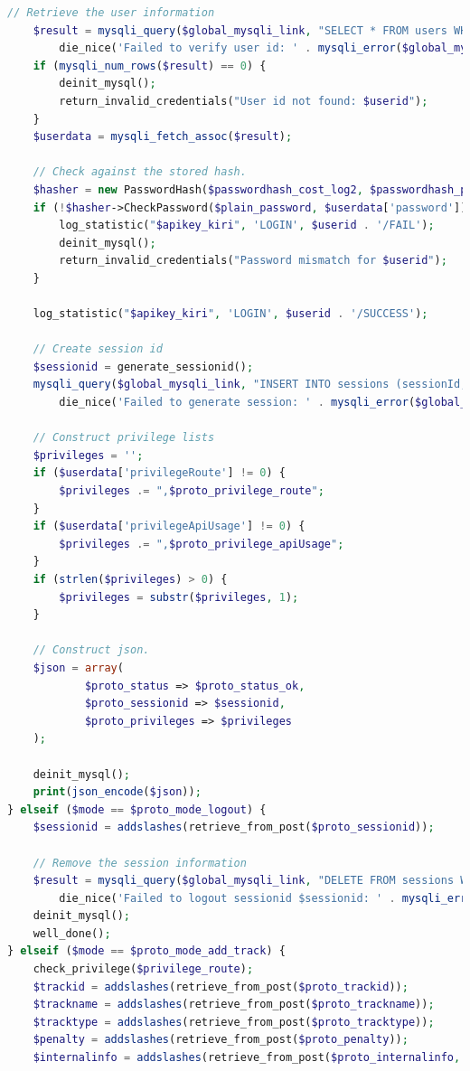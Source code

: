 \documentclass[a4paper,twoside]{article}
\begin{document}
\begin{enumerate}
\begin{lstlisting}[language=PHP,basicstyle=\tiny,caption=handle.php,label={lst:handle.php}]
	// Retrieve the user information
	$result = mysqli_query($global_mysqli_link, "SELECT * FROM users WHERE email='$userid'") or
		die_nice('Failed to verify user id: ' . mysqli_error($global_mysqli_link), true);
	if (mysqli_num_rows($result) == 0) {
		deinit_mysql();
		return_invalid_credentials("User id not found: $userid");
	}
	$userdata = mysqli_fetch_assoc($result);
	
	// Check against the stored hash.
	$hasher = new PasswordHash($passwordhash_cost_log2, $passwordhash_portable);
	if (!$hasher->CheckPassword($plain_password, $userdata['password'])) {
		log_statistic("$apikey_kiri", 'LOGIN', $userid . '/FAIL');
		deinit_mysql();
		return_invalid_credentials("Password mismatch for $userid");
	}
	
	log_statistic("$apikey_kiri", 'LOGIN', $userid . '/SUCCESS');
	
	// Create session id
	$sessionid = generate_sessionid();
	mysqli_query($global_mysqli_link, "INSERT INTO sessions (sessionId, email) VALUES ('$sessionid', '$userid')") or
		die_nice('Failed to generate session: ' . mysqli_error($global_mysqli_link), true);

	// Construct privilege lists
	$privileges = '';
	if ($userdata['privilegeRoute'] != 0) {
		$privileges .= ",$proto_privilege_route";
	}
	if ($userdata['privilegeApiUsage'] != 0) {
		$privileges .= ",$proto_privilege_apiUsage";
	}
	if (strlen($privileges) > 0) {
		$privileges = substr($privileges, 1);
	}
	
	// Construct json.
	$json = array(
			$proto_status => $proto_status_ok,
			$proto_sessionid => $sessionid,
			$proto_privileges => $privileges
	);
	
	deinit_mysql();
	print(json_encode($json));
} elseif ($mode == $proto_mode_logout) {
	$sessionid = addslashes(retrieve_from_post($proto_sessionid));

	// Remove the session information
	$result = mysqli_query($global_mysqli_link, "DELETE FROM sessions WHERE sessionId='$sessionid'") or
		die_nice('Failed to logout sessionid $sessionid: ' . mysqli_error($global_mysqli_link), true);
	deinit_mysql();
	well_done();	
} elseif ($mode == $proto_mode_add_track) {
	check_privilege($privilege_route); 
	$trackid = addslashes(retrieve_from_post($proto_trackid));
	$trackname = addslashes(retrieve_from_post($proto_trackname));
	$tracktype = addslashes(retrieve_from_post($proto_tracktype));
	$penalty = addslashes(retrieve_from_post($proto_penalty));
	$internalinfo = addslashes(retrieve_from_post($proto_internalinfo, false)) or $internalinfo = '';
	

\end{lstlisting}
\end{enumerate}
\end{document}
